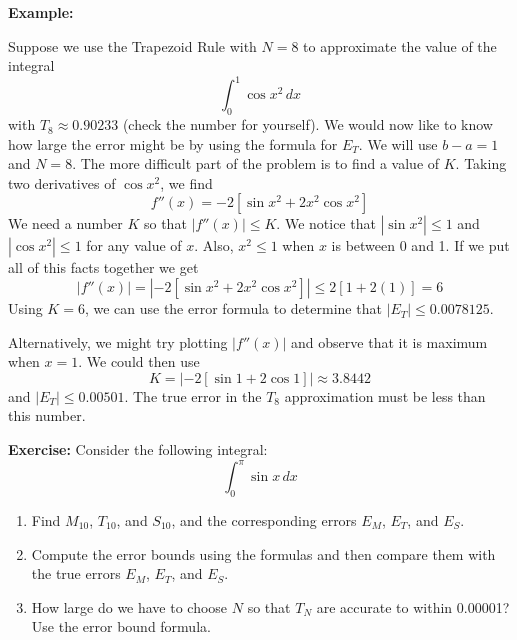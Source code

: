 \documentclass[11pt]{article}
\begin{document}
{\bf Example:}

Suppose we use the Trapezoid Rule with $N=8$ to approximate the value of the integral 
\begin{displaymath}
\int_0^1\cos{x^2} \,dx 
\end{displaymath}
with $T_8 \approx 0.90233$ (check the number for yourself).  We would now like to know how large the error might be
by using the formula for $E_T$.  We will use $b-a = 1$ and $N=8$.  The more difficult part of the problem is to find 
a value of $K$.  Taking two derivatives of $\cos{x^2}$, we find
\begin{displaymath}
f''(x) = -2\left[\sin{x^2}+2x^2\cos{x^2} \right]
\end{displaymath}
We need a number $K$ so that $|f''(x)| \leq K$.  We notice that $|\sin{x^2}| \leq 1$ and $|\cos{x^2}| \leq 1$ for any value of $x$. 
Also, $x^2 \leq 1$ when $x$ is between 0 and 1.  If we put all of this facts together we get 
\begin{displaymath}
|f''(x)| = |-2\left[\sin{x^2}+2x^2\cos{x^2} \right]| \leq 2\left[1+ 2(1)\right] = 6
\end{displaymath}
Using $K=6$, we can use the error formula to determine that $|E_T| \leq 0.0078125$.  

Alternatively, we might try plotting $|f''(x)|$ and observe that it is maximum when $x=1$.  We could then use
\begin{displaymath}
K = |-2\left[\sin{1}+2\cos{1} \right]| \approx 3.8442
\end{displaymath}
and $|E_T| \leq 0.00501$.  The true error in the $T_8$ approximation must be less than this number.  

\vspace{0.3cm}

{\bf Exercise:}
Consider the following integral:
\begin{displaymath}
\int_0^{\pi}\sin{x} \,dx 
\end{displaymath}
\begin{enumerate}
\item{Find $M_{10}$, $T_{10}$, and $S_{10}$, and the corresponding errors $E_M$, $E_T$, and $E_S$.}
\item{Compute the error bounds using the formulas and then compare them with the true errors $E_M$, $E_T$, and $E_S$.}
\item{How large do we have to choose $N$ so that $T_N$ are accurate to within 0.00001?  Use the error bound formula.}
\end{enumerate}
\end{document}
